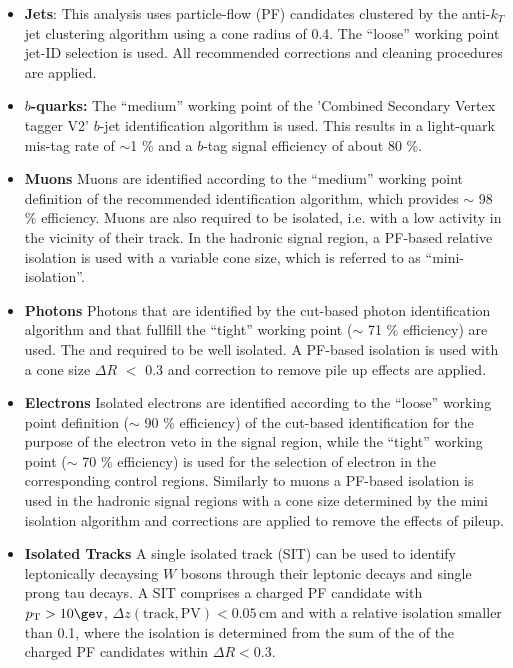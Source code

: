\begin{itemize}
  \item{\bf Jets}: This analysis uses particle-flow (PF) candidates clustered by the anti-$k_{T}$ jet clustering algorithm \cite{Cacciari:2008gp} using a cone radius of 0.4. The ``loose'' working point jet-ID selection is used. All recommended corrections and cleaning procedures are applied.   %
    
  \item{\bf $b$-quarks:} The  ``medium'' working point of the 'Combined Secondary Vertex tagger V2' $b$-jet identification algorithm is used. This results in a light-quark mis-tag rate of $\sim$1 \%  and a $b$-tag signal efficiency of about 80 \%.   

  \item{\bf Muons} Muons are identified according to the ``medium'' working point definition of the recommended identification algorithm, which provides $\sim$ 98 $\%$ efficiency. 
Muons are also required to be isolated, i.e. with a low activity in the vicinity of their track. In the hadronic signal region, a PF-based relative isolation is used with a variable cone size, which is referred to as ``mini-isolation''. 

  \item{\bf Photons} Photons that are identified by the cut-based photon identification algorithm \cite{photon-id} and that fullfill the ``tight'' working point ($\sim$ 71 $\%$ efficiency) are used. The and required to be well isolated.  A PF-based isolation is used with a cone size $\Delta R$ $<$ 0.3  and correction to remove pile up effects are applied.


  \item{\bf Electrons} Isolated electrons are identified according to the ``loose'' working point definition ($\sim$ 90 $\%$ efficiency)  of the cut-based identification \cite{electron-id} for the purpose of the electron veto in the signal region, while the ``tight'' working point ($\sim$ 70 $\%$ efficiency) is used for the selection of electron in the corresponding control regions. Similarly to muons a PF-based isolation \cite{pf-photon} is used in the hadronic signal regions with a cone size determined by the mini isolation algorithm and corrections are applied to remove the effects of pileup.

  \item{\bf Isolated Tracks}  A single isolated track (SIT) can be used to identify leptonically decaysing $W$ bosons through their leptonic decays and single prong tau decays.
    A SIT comprises a charged PF candidate with $\Pt > 10 \gev$, $\Delta z(\mathrm{track}, \mathrm{PV}) < 0.05 \, \mathrm{cm}$  and with a relative isolation smaller than 0.1, where the isolation is determined from the sum of the \Pt of the charged PF candidates within $\Delta R < 0.3$.


\end{itemize}
